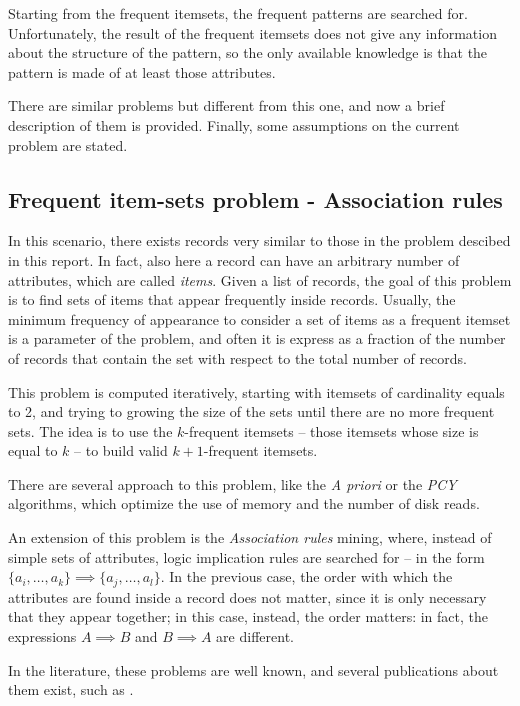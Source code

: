 \documentclass{acm_proc_article-sp-sigmod09}
\begin{document}
Starting from the frequent itemsets, the frequent patterns are searched for. Unfortunately, the result of the frequent itemsets does not give any information about the structure of the pattern, so the only available knowledge is that the pattern is made of at least those attributes.

There are similar problems but different from this one, and now a brief description of them is provided. Finally, some assumptions on the current problem are stated.

\subsection{Frequent item-sets problem - Association rules}
\label{sec:freqitemset}
In this scenario, there exists records very similar to those in the problem descibed in this report. In fact, also here a record can have an arbitrary number of attributes, which are called \emph{items}. Given a list of records, the goal of this problem is to find sets of items that appear frequently inside records. Usually, the minimum frequency of appearance to consider a set of items as a frequent itemset is a parameter of the problem, and often it is express as a fraction of the number of records that contain the set with respect to the total number of records.

This problem is computed iteratively, starting with itemsets of cardinality equals to 2, and trying to growing the size of the sets until there are no more frequent sets. The idea is to use the $k$-frequent itemsets -- those itemsets whose size is equal to $k$ -- to build valid $k + 1$-frequent itemsets.

There are several approach to this problem, like the \emph{A priori} or the \emph{PCY} algorithms, which optimize the use of memory and the number of disk reads.

An extension of this problem is the \emph{Association rules} mining, where, instead of simple sets of attributes, logic implication rules are searched for -- in the form $\{a_i, \dotsc, a_k\} \implies \{a_j, \dotsc, a_l\}$. In the previous case, the order with which the attributes are found inside a record does not matter, since it is only necessary that they appear together; in this case, instead, the order matters: in fact, the expressions $A \implies B$ and $B \implies A$ are different.

In the literature, these problems are well known, and several publications about them exist, such as \cite{agrawal1994fast, ivancsy2006time, rakesh1993mining, brin1997dynamic}.
\end{document}
